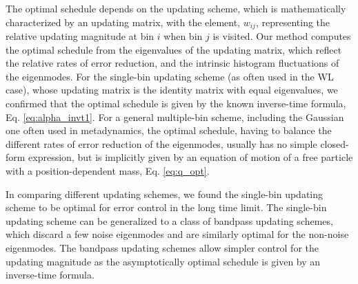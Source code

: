 \documentclass[preprint, superscriptaddress, floatfix]{revtex4-1}
\begin{document}
The optimal schedule depends on the updating scheme,
which is mathematically characterized by an updating matrix,
with the element, $w_{ij}$,
representing the relative updating magnitude
at bin $i$ when bin $j$ is visited.
%
Our method computes the optimal schedule from
the eigenvalues of the updating matrix,
which reflect the relative rates of error reduction,
and the intrinsic histogram fluctuations
of the eigenmodes.
%
For the single-bin updating scheme (as often used in the WL case),
whose updating matrix is the identity matrix with equal eigenvalues,
we confirmed that the optimal schedule
is given by the known inverse-time formula,
Eq. \eqref{eq:alpha_invt1}.
%
For a general multiple-bin scheme,
including the Gaussian one often used in metadynamics,
the optimal schedule, having to balance
the different rates of error reduction of the eigenmodes,
usually has no simple closed-form expression,
but is implicitly given by an equation of motion
of a free particle with a position-dependent mass,
Eq. \eqref{eq:q_opt}.
%



In comparing different updating schemes,
we found
the single-bin updating scheme to be optimal
for error control in the long time limit.
%
The single-bin updating scheme can be generalized to
a class of bandpass updating schemes,
which discard a few noise eigenmodes
and are similarly optimal for the non-noise eigenmodes.
%
The bandpass updating schemes allow simpler control
for the updating magnitude
as the asymptotically optimal schedule
is given by an inverse-time formula.
\end{document}
